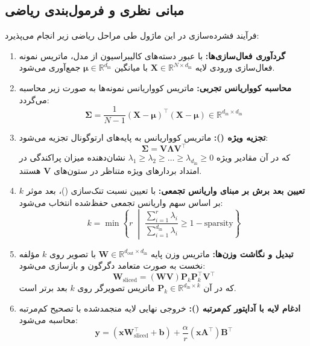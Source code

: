 \subsection{مبانی نظری و فرمول‌بندی ریاضی}
فرآیند فشرده‌سازی در این ماژول طی مراحل ریاضی زیر انجام می‌پذیرد:
\begin{enumerate}
    \item \textbf{گردآوری فعال‌سازی‌ها:} با عبور دسته‌های کالیبراسیون از مدل، ماتریس نمونه فعال‌سازی ورودی لایه $\mathbf{X} \in \mathbb{R}^{N \times d_{\text{in}}}$ با میانگین $\boldsymbol{\mu} \in \mathbb{R}^{d_{\text{in}}}$ جمع‌آوری می‌شود.
    \item \textbf{محاسبه کوواریانس تجربی:} ماتریس کوواریانس نمونه‌ها به صورت زیر محاسبه می‌گردد:
    \begin{equation}
    \boldsymbol{\Sigma} = \frac{1}{N - 1} (\mathbf{X} - \boldsymbol{\mu})^\top (\mathbf{X} - \boldsymbol{\mu}) \in \mathbb{R}^{d_{\text{in}} \times d_{\text{in}}}
    \end{equation}
    \item \textbf{تجزیه ویژه ():} ماتریس کوواریانس به پایه‌های ارتوگونال تجزیه می‌شود:
    \begin{equation}
    \boldsymbol{\Sigma} = \mathbf{V} \boldsymbol{\Lambda} \mathbf{V}^\top
    \end{equation}
    که در آن مقادیر ویژه $\lambda_1 \ge \lambda_2 \ge \dots \ge \lambda_{d_{\text{in}}} \ge 0$ نشان‌دهنده میزان پراکندگی در امتداد بردارهای ویژه متناظر در ستون‌های $\mathbf{V}$ هستند.
    \item \textbf{تعیین بعد برش بر مبنای واریانس تجمعی:} با تعیین نسبت تنک‌سازی ()، بعد موثر $k$ بر اساس سهم واریانس تجمعی حفظ‌شده انتخاب می‌شود:
    \begin{equation}
    k = \min \left\{ r \;\middle|\; \frac{\sum_{i=1}^r \lambda_i}{\sum_{i=1}^{d_{\text{in}}} \lambda_i} \ge 1 - \text{sparsity} \right\}
    \end{equation}
    \item \textbf{تبدیل و نگاشت وزن‌ها:} ماتریس وزن پایه $\mathbf{W} \in \mathbb{R}^{d_{\text{out}} \times d_{\text{in}}}$ با تصویر روی $k$ مؤلفه نخست به صورت متعامد دگرگون و بازسازی می‌شود:
    \begin{equation}
    \mathbf{W}_{\text{sliced}} = (\mathbf{W} \mathbf{V}) \mathbf{P}_k \mathbf{P}_k^\top \mathbf{V}^\top
    \end{equation}
    که در آن $\mathbf{P}_k \in \mathbb{R}^{d_{\text{in}} \times k}$ ماتریس تصویرگر روی $k$ بعد برتر است.
    \item \textbf{ادغام لایه با آداپتور کم‌مرتبه ():} خروجی نهایی لایه منجمدشده با تصحیح کم‌مرتبه محاسبه می‌شود:
    \begin{equation}
    \mathbf{y} = (\mathbf{x} \mathbf{W}_{\text{sliced}}^\top + \mathbf{b}) + \frac{\alpha}{r} (\mathbf{x} \mathbf{A}^\top) \mathbf{B}^\top
    \end{equation}
\end{enumerate}

